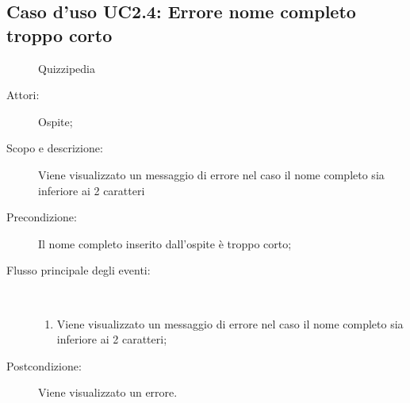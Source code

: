 \subsection{Caso d'uso UC2.4: Errore nome completo troppo corto}
	\begin{figure}[H]
		\centering
		\begin{resizedtikzpicture}{\textwidth}
		\begin{umlsystem}[x=0, fill=lightgray!20]{Quizzipedia}
		\end{umlsystem}
		\end{resizedtikzpicture}
		\caption{}
	\end{figure}
\begin{description}
\item[Attori:] Ospite;
\item[Scopo e descrizione:] Viene visualizzato un messaggio di errore nel caso il nome completo sia inferiore ai 2 caratteri
      \item[Precondizione:] Il nome completo inserito dall'ospite è troppo corto;

        \item[Flusso principale degli eventi:] \ 
 \begin{enumerate}
          \item Viene visualizzato un messaggio di errore nel caso il nome completo sia inferiore ai 2 caratteri;

      \end{enumerate}
    \item[Postcondizione:] Viene visualizzato un errore.
  \end{description}
\hypertarget{UC2.5}{}
